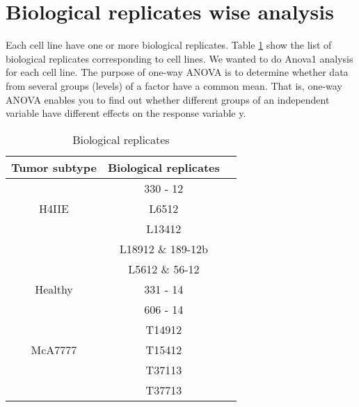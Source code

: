 \section{Biological replicates wise analysis}
Each cell line have one or more biological replicates. Table \ref{table:replicates} show the list of biological replicates corresponding to cell lines. We wanted to do Anova1 analysis for each cell line. The purpose of one-way ANOVA is to determine whether data from several groups (levels) of a factor have a common mean. That is, one-way ANOVA enables you to find out whether different groups of an independent variable have different effects on the response variable y.

\begin{table}
\begin{center}
\begin{tabular}{ |c|c|c| } 
\hline
Tumor subtype  & Biological replicates \\
\hline
\multirow{3}{4em}{H4IIE} & 330 - 12  \\ 
&L6512 \\ 
& L13412\\ 
& L18912 \& 189-12b \\
\hline
\multirow{3}{4em}{Healthy} & L5612 \& 56-12  \\ 
&331 - 14 \\ 
& 606 - 14\\ 
\hline
\multirow{3}{4em}{McA7777} & T14912 \\
& T15412 \\
& T37113 \\
& T37713 \\
\hline
\end{tabular}
\end{center}
\label{table:replicates}
\caption{Biological replicates}
\end{table}


